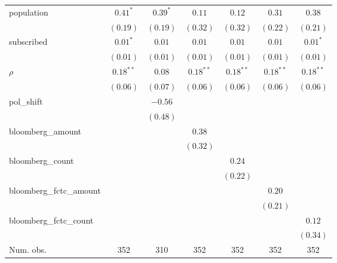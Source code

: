 \begin{table}[!h]
\begin{center}
\begin{tabular}{l c c c c c c }
population              & $0.41^{*}$   & $0.39^{*}$   & $0.11$       & $0.12$       & $0.31$       & $0.38$       \\
                        & $(0.19)$     & $(0.19)$     & $(0.32)$     & $(0.32)$     & $(0.22)$     & $(0.21)$     \\
subscribed              & $0.01^{*}$   & $0.01$       & $0.01$       & $0.01$       & $0.01$       & $0.01^{*}$   \\
                        & $(0.01)$     & $(0.01)$     & $(0.01)$     & $(0.01)$     & $(0.01)$     & $(0.01)$     \\
$\rho$                  & $0.18^{**}$  & $0.08$       & $0.18^{**}$  & $0.18^{**}$  & $0.18^{**}$  & $0.18^{**}$  \\
                        & $(0.06)$     & $(0.07)$     & $(0.06)$     & $(0.06)$     & $(0.06)$     & $(0.06)$     \\
pol\_shift              &              & $-0.56$      &              &              &              &              \\
                        &              & $(0.48)$     &              &              &              &              \\
bloomberg\_amount       &              &              & $0.38$       &              &              &              \\
                        &              &              & $(0.32)$     &              &              &              \\
bloomberg\_count        &              &              &              & $0.24$       &              &              \\
                        &              &              &              & $(0.22)$     &              &              \\
bloomberg\_fctc\_amount &              &              &              &              & $0.20$       &              \\
                        &              &              &              &              & $(0.21)$     &              \\
bloomberg\_fctc\_count  &              &              &              &              &              & $0.12$       \\
                        &              &              &              &              &              & $(0.34)$     \\
\midrule
Num. obs.               & 352          & 310          & 352          & 352          & 352          & 352          \\

\end{tabular}
\end{center}
\end{table}
